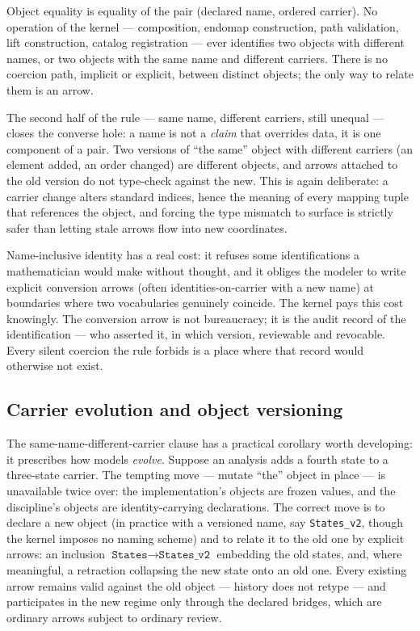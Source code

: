 \begin{ruleenv}\label{ch03:rule:name-identity}
Object equality is equality of the pair (declared name, ordered carrier).
No operation of the kernel --- composition, endomap construction, path
validation, lift construction, catalog registration --- ever identifies two
objects with different names, or two objects with the same name and
different carriers. There is no coercion path, implicit or explicit,
between distinct objects; the only way to relate them is an arrow.
\end{ruleenv}

The second half of the rule --- same name, different carriers, still
unequal --- closes the converse hole: a name is not a \emph{claim} that
overrides data, it is one component of a pair. Two versions of ``the same''
object with different carriers (an element added, an order changed) are
different objects, and arrows attached to the old version do not type-check
against the new. This is again deliberate: a carrier change alters standard
indices, hence the meaning of every mapping tuple that references the
object, and forcing the type mismatch to surface is strictly safer than
letting stale arrows flow into new coordinates.

\begin{remark}\label{ch03:rem:cost}
Name-inclusive identity has a real cost: it refuses some identifications a
mathematician would make without thought, and it obliges the modeler to
write explicit conversion arrows (often identities-on-carrier with a new
name) at boundaries where two vocabularies genuinely coincide. The kernel
pays this cost knowingly. The conversion arrow is not bureaucracy; it is
the audit record of the identification --- who asserted it, in which
version, reviewable and revocable. Every silent coercion the rule forbids
is a place where that record would otherwise not exist.
\end{remark}

\subsection{Carrier evolution and object versioning}

The same-name-different-carrier clause has a practical corollary worth
developing: it prescribes how models \emph{evolve}. Suppose an analysis
adds a fourth state to a three-state carrier. The tempting move ---
mutate ``the'' object in place --- is unavailable twice over: the
implementation's objects are frozen values, and the discipline's objects
are identity-carrying declarations. The correct move is to declare a new
object (in practice with a versioned name, say
\texttt{States\_v2}, though the kernel imposes no naming scheme) and to
relate it to the old one by explicit arrows: an inclusion
$\texttt{States} \to \texttt{States\_v2}$ embedding the old states, and,
where meaningful, a retraction collapsing the new state onto an old one.
Every existing arrow remains valid against the old object --- history
does not retype --- and participates in the new regime only through the
declared bridges, which are ordinary arrows subject to ordinary review.

